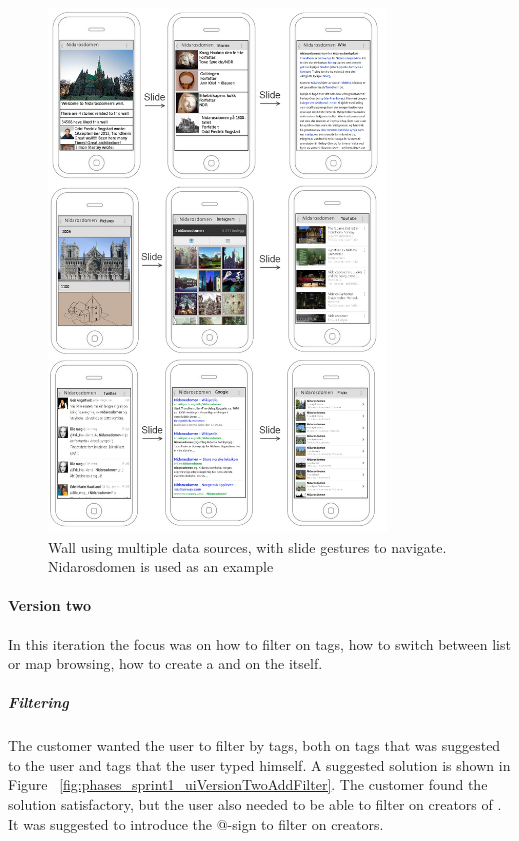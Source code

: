 \documentclass[11pt]{book}
\begin{document}
\begin{figure}[H]
    \centering
    \includegraphics[width=0.8\textwidth]{Figures/Phases/Sprint1/versiononeMultipleDataSourcesWall2.png}
    \caption{Wall using multiple data sources, with slide gestures to navigate. Nidarosdomen is used as an example}
    \label{fig:phases_sprint1_uiVersionOneMultipleDataSoruces}
\end{figure}

\paragraph{Version two}

In this iteration the focus was on how to filter \wallentityp on tags, how to switch between list or map browsing, how to create a \wallentitys and on the \wallentitys itself. 

\subparagraph{Filtering \wallentityp}
The customer wanted the user to filter by tags, both on tags that was suggested to the user and tags that the user typed himself. A suggested solution is shown in Figure ~\ref{fig:phases_sprint1_uiVersionTwoAddFilter}. The customer found the solution satisfactory, but the user also needed to be able to filter on creators of \wallentityp. It was suggested to introduce the @-sign to filter on creators.
\end{document}
